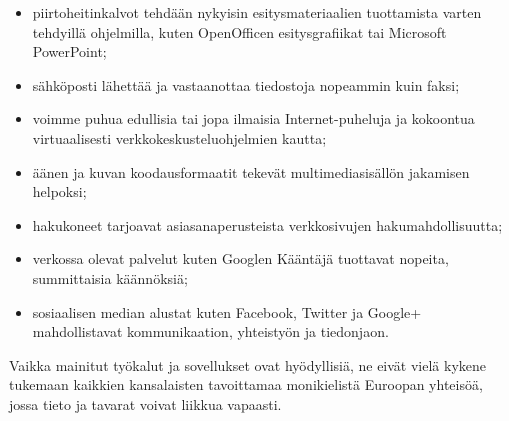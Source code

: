 \documentclass[]{../../metanetpaper}
\begin{document}
\begin{Parallel}[c]{70mm}{70mm}
{\begin{itemize}
\item piirtoheitinkalvot tehdään nykyisin esitysmateriaalien
tuottamista varten tehdyillä ohjelmilla, kuten
\foreignlanguage{english}{OpenOfficen} esitysgrafiikat tai Microsoft
PowerPoint;

\item sähköposti lähettää ja vastaanottaa tiedostoja nopeammin kuin faksi;

\item voimme puhua edullisia tai jopa ilmaisia Internet-puheluja ja kokoontua
virtuaalisesti verkkokeskusteluohjelmien kautta;

\item äänen ja kuvan koodausformaatit tekevät multimediasisällön jakamisen helpoksi;

\item hakukoneet tarjoavat asiasanaperusteista verkkosivujen hakumahdollisuutta;

\item verkossa olevat palvelut kuten Googlen Kääntäjä tuottavat nopeita, summittaisia
käännöksiä;

\item sosiaalisen median alustat kuten Facebook, Twitter ja Google+ mahdollistavat
kommunikaation, yhteistyön ja tiedonjaon.
\end{itemize}
Vaikka mainitut työkalut ja sovellukset ovat hyödyllisiä, ne eivät vielä kykene
tukemaan kaikkien kansalaisten tavoittamaa monikielistä Euroopan yhteisöä,
jossa tieto ja tavarat voivat liikkua vapaasti.
}

\end{Parallel}
\end{document}
